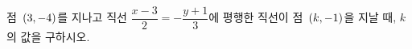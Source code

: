 점~$(3{,}\mkern3mu\mathopen{}-4)$를 지나고 직선 $\dfrac{x-3}{2}=-\dfrac{y+1}{3}$에 평행한 직선이 점~$(k{,}\mkern3mu\mathopen{}-1)$을 지날 때, $k$의 값을 구하시오.
